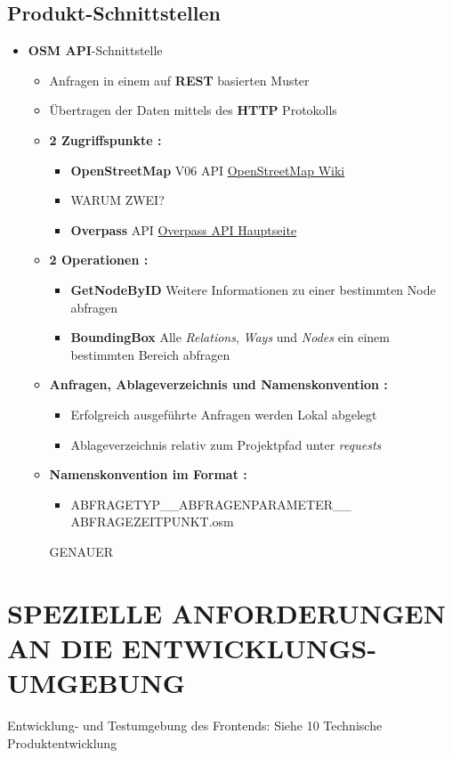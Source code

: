 	\subsection{Produkt-Schnittstellen}
	\begin{itemize}
		\item \textbf{OSM API}-Schnittstelle
		\begin{itemize}
			\item Anfragen in einem auf \textbf{REST} basierten Muster
			\item Übertragen der Daten mittels des \textbf{HTTP} Protokolls
			\item \textbf{2 Zugriffspunkte :}
			\begin{itemize}
				\item \textbf{OpenStreetMap} V06 API \href{http://wiki.openstreetmap.org/wiki/API_v0.6}{OpenStreetMap Wiki}
				\item WARUM ZWEI?
				\item \textbf{Overpass} API \href{http://overpass-api.de/}{Overpass API Hauptseite}
			\end{itemize}
			\item \textbf{2 Operationen :}
			\begin{itemize}
				\item \textbf{GetNodeByID} Weitere Informationen zu einer bestimmten Node abfragen
				\item \textbf{BoundingBox} Alle \textit{Relations}, \textit{Ways} und \textit{Nodes} ein einem
					bestimmten Bereich abfragen
			\end{itemize}
			\item \textbf{Anfragen, Ablageverzeichnis und Namenskonvention :}			
			\begin{itemize}
				\item Erfolgreich ausgeführte Anfragen werden Lokal abgelegt
				\item Ablageverzeichnis relativ zum Projektpfad unter \textit{requests}
			\end{itemize}
				\item \textbf{Namenskonvention im Format :}
				\begin{itemize}
				\item ABFRAGETYP\_\_ABFRAGENPARAMETER\_\_\\ABFRAGEZEITPUNKT.osm
				\end{itemize}		
				GENAUER					
		\end{itemize}
	\end{itemize}
	
	\section{\Large SPEZIELLE ANFORDERUNGEN AN DIE ENTWICKLUNGS-UMGEBUNG}
	Entwicklung- und Testumgebung des Frontends: Siehe 10 Technische Produktentwicklung 
